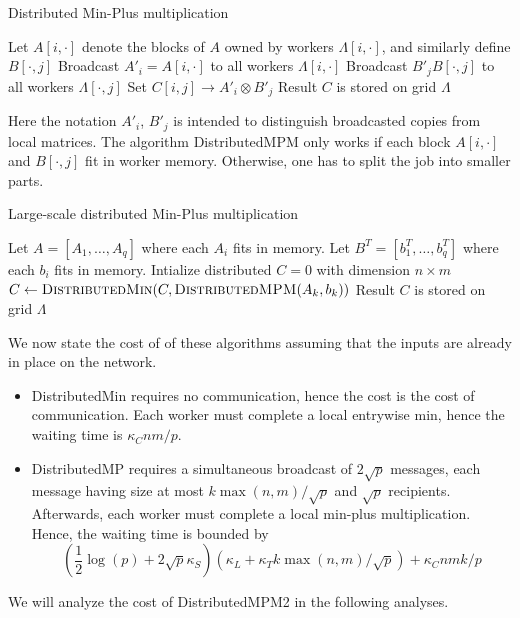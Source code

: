 \documentclass{article} %
\begin{document}
\begin{algorithm}[H]
\caption{Distributed Min-Plus multiplication}
\begin{algorithmic}
  \State Let $A[i, \cdot]$ denote the blocks of $A$ owned by workers $\Lambda[i, \cdot]$, and similarly define $B[\cdot, j]$
    \State Broadcast $A'_i = A[i, \cdot]$ to all workers $\Lambda[i, \cdot]$
    \State Broadcast $B'_j B[\cdot, j]$ to all workers $\Lambda[\cdot, j]$
  \EndFor
    \State Set $C[i, j] \to A'_i \otimes B'_j$
  \EndFor
  \State Result $C$ is stored on grid $\Lambda$
\EndFunction
\end{algorithmic}
\end{algorithm}

Here the notation $A'_i$, $B'_j$ is intended to distinguish broadcasted copies from local matrices.
The algorithm {\sc DistributedMPM} only works if each block $A[i, \cdot]$ and $B[\cdot, j]$ fit in worker memory.
Otherwise, one has to split the job into smaller parts.

\begin{algorithm}[H]
\caption{Large-scale distributed Min-Plus multiplication}
\begin{algorithmic}
  \State Let $A = [A_1,\hdots, A_q]$ where each $A_i$ fits in memory.
  \State Let $B^T = [b_1^T, \hdots, b_q^T]$ where each $b_i$ fits in memory.
  \State Intialize distributed $C = 0$ with dimension $n \times m$
    \State $C \leftarrow \text{\sc DistributedMin}(C, \text{\sc DistributedMPM}(A_k, b_k))$
  \EndFor
  \State Result $C$ is stored on grid $\Lambda$
\EndFunction
\end{algorithmic}
\end{algorithm}

We now state the cost of of these algorithms assuming that the inputs
are already in place on the network.
\begin{itemize}
\item {\sc DistributedMin} requires no communication, hence the cost
  is the cost of communication.  Each worker must complete a local
  entrywise min, hence the waiting time is $\kappa_C nm/p$.
\item {\sc DistributedMP} requires a simultaneous broadcast of
  $2\sqrt{p}$ messages, each message having size at most $k\max(n,m)/\sqrt{p}$ and $\sqrt{p}$ recipients.
  Afterwards, each worker must complete a local min-plus multiplication.
  Hence, the waiting time is bounded by
\[
(\frac{1}{2}\log(p) + 2\sqrt{p}\kappa_S) (\kappa_L + \kappa_T k \max(n, m)/\sqrt{p}) + \kappa_C nmk/p
\] 
\end{itemize}
We will analyze the cost of {\sc DistributedMPM2} in the following analyses.
\end{document}
